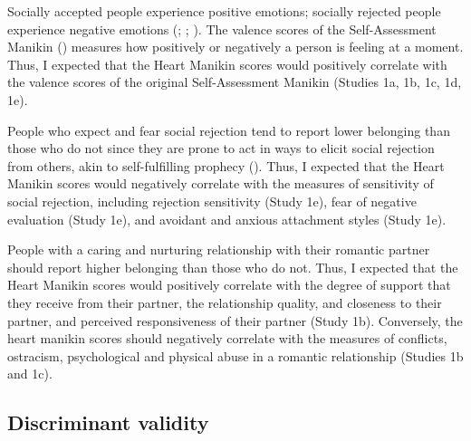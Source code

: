 \documentclass[
]{udthesis}
\begin{document}
Socially accepted people experience positive emotions; socially rejected people experience negative
emotions (; ; ). The
valence scores of the Self-Assessment Manikin () measures how
positively or negatively a person is feeling at a moment. Thus, I
expected that the Heart Manikin scores would positively correlate with
the valence scores of the original Self-Assessment Manikin (Studies 1a,
1b, 1c, 1d, 1e).

People who expect and fear social rejection tend to report lower belonging
than those who do not since they are prone to act in ways to elicit
social rejection from others, akin to self-fulfilling prophecy (). Thus, I
expected that the Heart Manikin scores would negatively correlate with
the measures of sensitivity of social rejection, including rejection
sensitivity (Study 1e), fear of negative evaluation (Study 1e), and
avoidant and anxious attachment styles (Study 1e).

People with a caring and nurturing relationship with their romantic
partner should report higher belonging than those who do not. Thus, I
expected that the Heart Manikin scores would positively correlate with
the degree of support that they receive from their partner, the
relationship quality, and closeness to their partner, and perceived
responsiveness of their partner (Study 1b). Conversely, the heart
manikin scores should negatively correlate with the measures of
conflicts, ostracism, psychological and physical abuse in a romantic
relationship (Studies 1b and 1c).

\subsection{Discriminant validity}\label{discriminant-validity}
\end{document}
